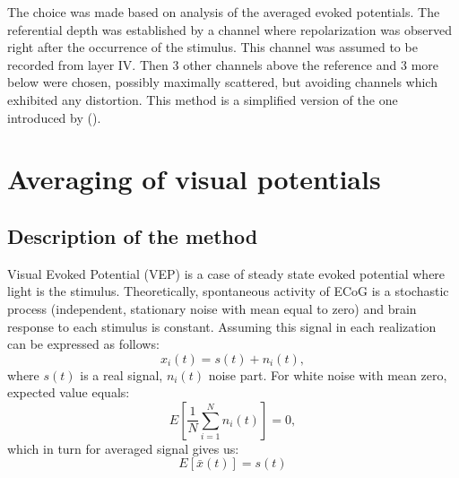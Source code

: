 \documentclass{pracalicmgr}
\begin{document}
   The choice was made based on analysis of the averaged evoked potentials. The referential depth was established by a channel where repolarization was observed right after the occurrence of the stimulus. This channel was assumed to be recorded from layer IV. Then 3 other channels above the reference and 3 more below were chosen, possibly maximally scattered, but avoiding channels which exhibited any distortion. This method is a simplified version of the one introduced by (\cite{maier2011}).
   
   
   \section{Averaging of visual potentials}
   
   \subsection{Description of the method}
   Visual Evoked Potential (VEP) is a case of steady state evoked potential where light is the stimulus. Theoretically, spontaneous activity of ECoG is a stochastic process (independent, stationary noise with mean equal to zero) and brain response to each stimulus is constant. 
   Assuming this signal in each realization can be expressed as follows:
   \begin{equation}
   x_i(t) = s(t) + n_i(t),
   \end{equation}
   where $s(t)$ is a real signal, $n_i(t)$ noise part. For white noise with mean zero, expected value equals:
   \begin{equation}
   E\left[ \frac{1}{N}\sum_{i=1}^{N} n_i(t)\right] = 0, 
   \end{equation}
   which in turn for averaged signal gives us:
   \begin{equation}
   E\left[ \bar{x}(t) \right] = s(t)
   \end{equation}
   
\end{document}
